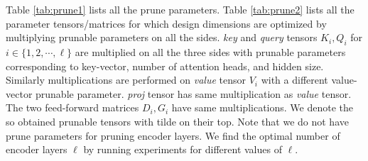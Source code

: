 \documentclass[11pt,a4paper]{article}
\begin{document}
Table \ref{tab:prune1} lists all the prune parameters. Table \ref{tab:prune2} lists all the parameter tensors/matrices for which design dimensions are optimized by multiplying prunable parameters on all the sides. {\em key} and {\em query} tensors $K_i, Q_i$ for $i \in \{1,2,\cdots,\ell\}$ are multiplied on all the three sides with prunable parameters corresponding to key-vector, number of attention heads, and hidden size. Similarly multiplications are performed on {\em value} tensor $V_i$ with a different value-vector prunable parameter. {\em proj} tensor has same multiplication as {\em value} tensor. The two feed-forward matrices $D_i, G_i$ have same multiplications. We denote the so obtained prunable tensors with tilde on their top. Note that we do not have prune parameters for pruning encoder layers. We find the optimal number of encoder layers $\ell$ by running experiments for different values of $\ell$. 
\end{document}
